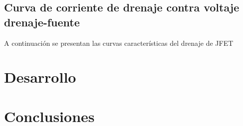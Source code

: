 \documentclass{mylib/reporteConCalif}
\begin{document}

\subsection{Curva de corriente de drenaje contra voltaje drenaje-fuente}

A continuación se presentan las curvas características del drenaje de JFET




  \newpage
\section{Desarrollo}


\section{Conclusiones}
\end{document}
